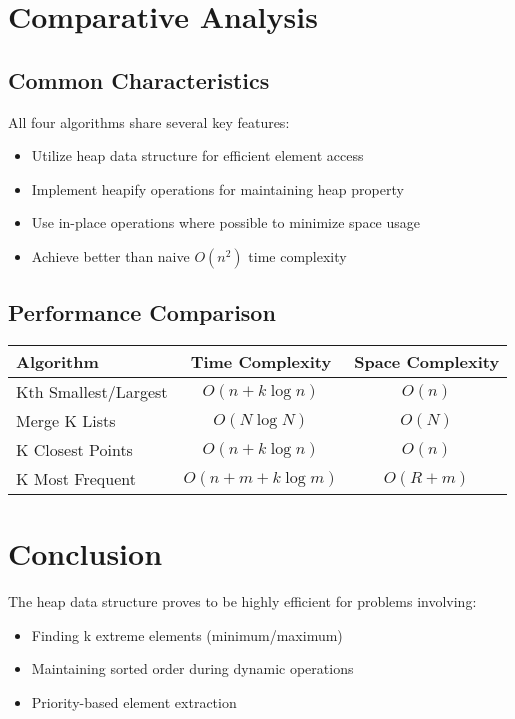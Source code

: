 \documentclass[12pt]{article}
\begin{document}
\section{Comparative Analysis}
\subsection{Common Characteristics}
All four algorithms share several key features:
\begin{itemize}
    \item Utilize heap data structure for efficient element access
    \item Implement heapify operations for maintaining heap property
    \item Use in-place operations where possible to minimize space usage
    \item Achieve better than naive $O(n^2)$ time complexity
\end{itemize}

\subsection{Performance Comparison}
\begin{center}
\begin{tabular}{|l|c|c|}
\hline
\textbf{Algorithm} & \textbf{Time Complexity} & \textbf{Space Complexity} \\
\hline
Kth Smallest/Largest & $O(n + k \log n)$ & $O(n)$ \\
\hline
Merge K Lists & $O(N \log N)$ & $O(N)$ \\
\hline
K Closest Points & $O(n + k \log n)$ & $O(n)$ \\
\hline
K Most Frequent & $O(n + m + k \log m)$ & $O(R + m)$ \\
\hline
\end{tabular}
\end{center}

\section{Conclusion}
The heap data structure proves to be highly efficient for problems involving:
\begin{itemize}
    \item Finding k extreme elements (minimum/maximum)
    \item Maintaining sorted order during dynamic operations
    \item Priority-based element extraction
\end{itemize}
\end{document}
